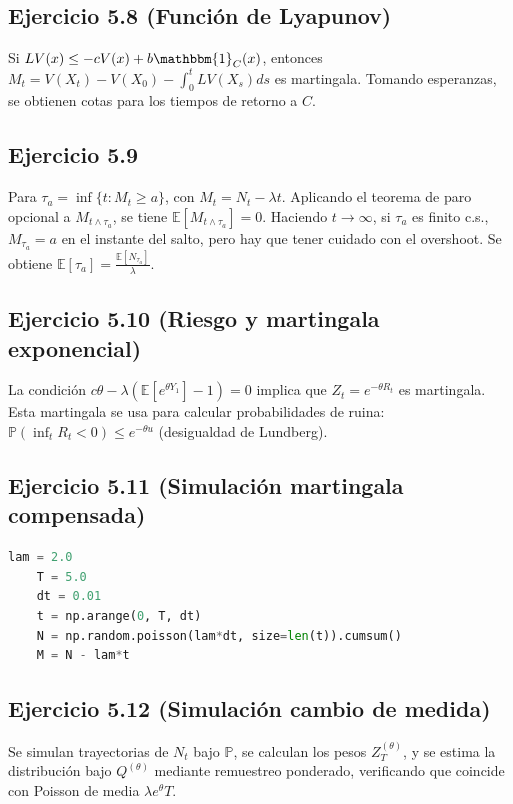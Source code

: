 \documentclass[letterpaper, 12pt]{article}
\newcommand{\E}{\mathbb{E}}
\renewcommand{\P}{\mathbb{P}}
\newcommand{\1}{\mathbbm{1}}
\begin{document}
    \subsection{Ejercicio 5.8 (Funci\'on de Lyapunov)}
    Si $LV(x)\le -cV(x)+b\1_C(x)$, entonces $M_t=V(X_t)-V(X_0)-\int_0^t LV(X_s)ds$ es martingala. Tomando esperanzas, se obtienen cotas para los tiempos de retorno a $C$.

    \subsection{Ejercicio 5.9}
    Para $\tau_a=\inf\{t:M_t\ge a\}$, con $M_t=N_t-\lambda t$. Aplicando el teorema de paro opcional a $M_{t\wedge\tau_a}$, se tiene $\E[M_{t\wedge\tau_a}]=0$. Haciendo $t\to\infty$, si $\tau_a$ es finito c.s., $M_{\tau_a}=a$ en el instante del salto, pero hay que tener cuidado con el overshoot. Se obtiene $\E[\tau_a]=\frac{\E[N_{\tau_a}]}{\lambda}$.

    \subsection{Ejercicio 5.10 (Riesgo y martingala exponencial)}
    La condici\'on $c\theta-\lambda(\E[e^{\theta Y_1}]-1)=0$ implica que $Z_t=e^{-\theta R_t}$ es martingala. Esta martingala se usa para calcular probabilidades de ruina: $\P(\inf_t R_t<0)\le e^{-\theta u}$ (desigualdad de Lundberg).

    \subsection{Ejercicio 5.11 (Simulaci\'on martingala compensada)}
    \begin{lstlisting}[language=Python]
    lam = 2.0
    T = 5.0
    dt = 0.01
    t = np.arange(0, T, dt)
    N = np.random.poisson(lam*dt, size=len(t)).cumsum()
    M = N - lam*t
    \end{lstlisting}

    \subsection{Ejercicio 5.12 (Simulaci\'on cambio de medida)}
    Se simulan trayectorias de $N_t$ bajo $\P$, se calculan los pesos $Z_T^{(\theta)}$, y se estima la distribuci\'on bajo $Q^{(\theta)}$ mediante remuestreo ponderado, verificando que coincide con Poisson de media $\lambda e^\theta T$.

    
    
\end{document}
